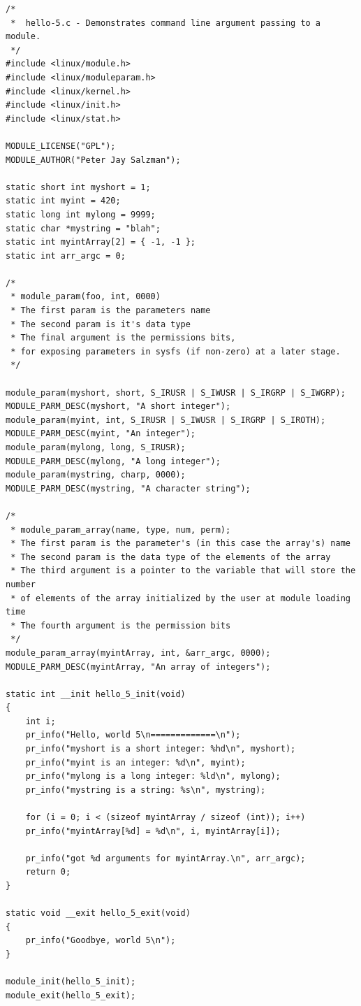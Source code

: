 \documentclass[11pt]{article}
\begin{document}
\begin{verbatim}
/*
 *  hello-5.c - Demonstrates command line argument passing to a module.
 */
#include <linux/module.h>
#include <linux/moduleparam.h>
#include <linux/kernel.h>
#include <linux/init.h>
#include <linux/stat.h>

MODULE_LICENSE("GPL");
MODULE_AUTHOR("Peter Jay Salzman");

static short int myshort = 1;
static int myint = 420;
static long int mylong = 9999;
static char *mystring = "blah";
static int myintArray[2] = { -1, -1 };
static int arr_argc = 0;

/*
 * module_param(foo, int, 0000)
 * The first param is the parameters name
 * The second param is it's data type
 * The final argument is the permissions bits,
 * for exposing parameters in sysfs (if non-zero) at a later stage.
 */

module_param(myshort, short, S_IRUSR | S_IWUSR | S_IRGRP | S_IWGRP);
MODULE_PARM_DESC(myshort, "A short integer");
module_param(myint, int, S_IRUSR | S_IWUSR | S_IRGRP | S_IROTH);
MODULE_PARM_DESC(myint, "An integer");
module_param(mylong, long, S_IRUSR);
MODULE_PARM_DESC(mylong, "A long integer");
module_param(mystring, charp, 0000);
MODULE_PARM_DESC(mystring, "A character string");

/*
 * module_param_array(name, type, num, perm);
 * The first param is the parameter's (in this case the array's) name
 * The second param is the data type of the elements of the array
 * The third argument is a pointer to the variable that will store the number
 * of elements of the array initialized by the user at module loading time
 * The fourth argument is the permission bits
 */
module_param_array(myintArray, int, &arr_argc, 0000);
MODULE_PARM_DESC(myintArray, "An array of integers");

static int __init hello_5_init(void)
{
    int i;
    pr_info("Hello, world 5\n=============\n");
    pr_info("myshort is a short integer: %hd\n", myshort);
    pr_info("myint is an integer: %d\n", myint);
    pr_info("mylong is a long integer: %ld\n", mylong);
    pr_info("mystring is a string: %s\n", mystring);

    for (i = 0; i < (sizeof myintArray / sizeof (int)); i++)
	pr_info("myintArray[%d] = %d\n", i, myintArray[i]);

    pr_info("got %d arguments for myintArray.\n", arr_argc);
    return 0;
}

static void __exit hello_5_exit(void)
{
    pr_info("Goodbye, world 5\n");
}

module_init(hello_5_init);
module_exit(hello_5_exit);
\end{verbatim}
\end{document}
